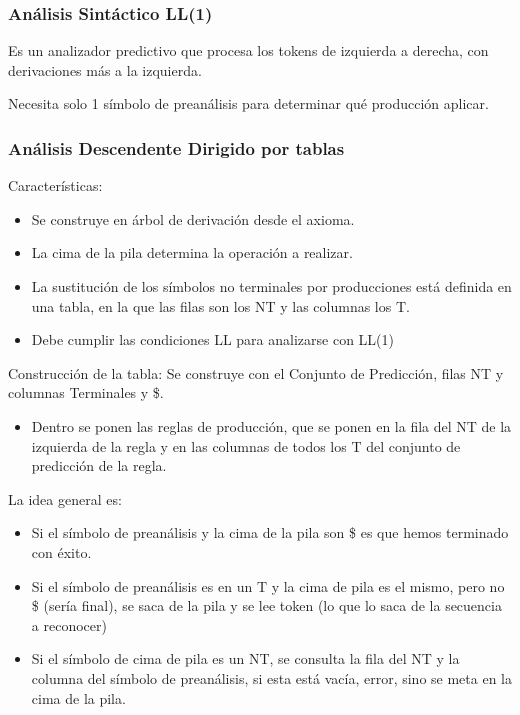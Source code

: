 \documentclass[12pt, twoside, openright]{report} %
\begin{document}
\pagebreak

\subsubsection{Análisis Sintáctico LL(1)}

Es un analizador predictivo que procesa los tokens de izquierda a
derecha, con derivaciones más a la izquierda.

Necesita solo 1 símbolo de preanálisis para determinar qué producción
aplicar.


\subsubsection{Análisis Descendente Dirigido por tablas}

Características:

\begin{itemize}

\item
  Se construye en árbol de derivación desde el axioma.
\item
  La cima de la pila determina la operación a realizar.
\item
  La sustitución de los símbolos no terminales por producciones está
  definida en una tabla, en la que las filas son los NT y las columnas
  los T.
\item
  Debe cumplir las condiciones LL para analizarse con LL(1)
\end{itemize}

Construcción de la tabla: Se construye con el Conjunto de Predicción,
filas NT y columnas Terminales y \$.

\begin{itemize}

\item
  Dentro se ponen las reglas de producción, que se ponen en la fila del
  NT de la izquierda de la regla y en las columnas de todos los T del
  conjunto de predicción de la regla.
\end{itemize}

La idea general es:

\begin{itemize}

\item
  Si el símbolo de preanálisis y la cima de la pila son \$ es que hemos
  terminado con éxito.
\item
  Si el símbolo de preanálisis es en un T y la cima de pila es el mismo,
  pero no \$ (sería final), se saca de la pila y se lee token (lo que lo
  saca de la secuencia a reconocer)
\item
  Si el símbolo de cima de pila es un NT, se consulta la fila del NT y
  la columna del símbolo de preanálisis, si esta está vacía, error, sino
  se meta en la cima de la pila.
\end{itemize}
\end{document}
